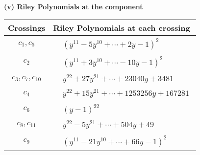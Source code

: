 \documentclass[1p]{elsarticle_modified}
\theoremstyle{definition}
\begin{document}
\newpage\renewcommand{\arraystretch}{1}
\flushleft \textbf{(v) Riley Polynomials at the component}\newline \\
\begin{tabular}{m{50pt}|m{274pt}}
Crossings & \hspace{64pt}Riley Polynomials at each crossing \\
\hline $$\begin{aligned}c_{1},c_{5}\end{aligned}$$&$\begin{aligned}
&(y^{11}-5 y^{10}+\cdots+2 y-1)^{2}
\end{aligned}$\\
\hline $$\begin{aligned}c_{2}\end{aligned}$$&$\begin{aligned}
&(y^{11}+3 y^{10}+\cdots-10 y-1)^{2}
\end{aligned}$\\
\hline $$\begin{aligned}c_{3},c_{7},c_{10}\end{aligned}$$&$\begin{aligned}
&y^{22}+27 y^{21}+\cdots+23040 y+3481
\end{aligned}$\\
\hline $$\begin{aligned}c_{4}\end{aligned}$$&$\begin{aligned}
&y^{22}+15 y^{21}+\cdots+1253256 y+167281
\end{aligned}$\\
\hline $$\begin{aligned}c_{6}\end{aligned}$$&$\begin{aligned}
&(y-1)^{22}
\end{aligned}$\\
\hline $$\begin{aligned}c_{8},c_{11}\end{aligned}$$&$\begin{aligned}
&y^{22}-5 y^{21}+\cdots+504 y+49
\end{aligned}$\\
\hline $$\begin{aligned}c_{9}\end{aligned}$$&$\begin{aligned}
&(y^{11}-21 y^{10}+\cdots+66 y-1)^{2}
\end{aligned}$\\
\hline
\end{tabular}\\~\\
\end{document}
